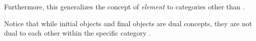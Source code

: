 \documentclass{seminar}
\newcommand{\NAT}{\textcolor{MathColor}{\ensuremath{\mathbb{N}}}}
\newcommand{\suc}{\tmi{succ}}
\newcommand{\vs}{\vspace{0.3in}}
\begin{document}
\begin{slide}
Furthermore, this generalizes the concept of
\textit{element} to categories other
than .

\vs

Notice that while initial objects and final objects are dual concepts,
they are not dual to each other within the specific category
.

\newslide














\end{slide}
\end{document}
